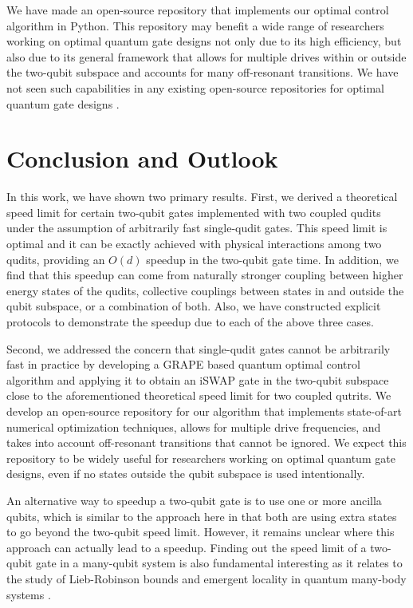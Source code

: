 \documentclass[twocolumn,english,pra,superscriptaddress]{revtex4-1}
\begin{document}
We have made an open-source repository \cite{Basyildiz2023} that implements our optimal control algorithm in Python. This repository may benefit a wide range of researchers working on optimal quantum gate designs not only due to its high efficiency, but also due to its general framework that allows for multiple drives within or outside the two-qubit subspace and accounts for many off-resonant transitions. We have not seen such capabilities in any existing open-source repositories for optimal quantum gate designs \cite{qutip,Schuster1,Schuster2,LLNL1,LLNL2}.

\section{Conclusion and Outlook}\vspace{-5pt}
In this work, we have shown two primary results. First, we derived a theoretical speed limit for certain two-qubit gates implemented with two coupled qudits under the assumption of arbitrarily fast single-qudit gates. This speed limit is optimal and it can be exactly achieved with physical interactions among two qudits, providing an $O(d)$ speedup in the two-qubit gate time. In addition, we find that this speedup can come from naturally stronger coupling between higher energy states of the qudits, collective couplings between states in and outside the qubit subspace, or a combination of both. Also, we have constructed explicit protocols to demonstrate the speedup due to each of the above three cases.

Second, we addressed the concern that single-qudit gates cannot be arbitrarily fast in practice by developing a GRAPE based quantum optimal control algorithm and applying it to obtain an iSWAP gate in the two-qubit subspace close to the aforementioned theoretical speed limit for two coupled qutrits. We develop an open-source repository for our algorithm that implements state-of-art numerical optimization techniques, allows for multiple drive frequencies, and takes into account off-resonant transitions that cannot be ignored. We expect this repository to be widely useful for researchers working on optimal quantum gate designs, even if no states outside the qubit subspace is used intentionally.

An alternative way to speedup a two-qubit gate is to use one or more ancilla qubits, which is similar to the approach here in that both are using extra states to go beyond the two-qubit speed limit. However, it remains unclear where this approach can actually lead to a speedup. Finding out the speed limit of a two-qubit gate in a many-qubit system is also fundamental interesting as it relates to the study of Lieb-Robinson bounds and emergent locality in quantum many-body systems \cite{Chen2023}.
\end{document}
